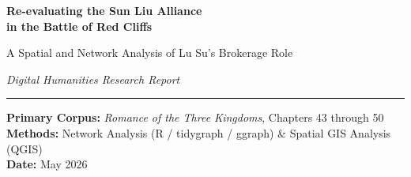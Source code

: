 \documentclass[12pt, a4paper]{article}
\newcommand{\booktitle}[1]{\textit{#1}}
\begin{document}

\begin{titlepage}
  \centering
  \vspace*{2cm}

  {\LARGE\bfseries Re-evaluating the Sun Liu Alliance\\[0.4em]
  in the Battle of Red Cliffs\par}

  \vspace{0.8cm}
  {\large A Spatial and Network Analysis of Lu Su's Brokerage Role\par}

  \vspace{1.5cm}
  {\large\itshape Digital Humanities Research Report\par}

  \vspace{0.8cm}
  \hrule height 0.6pt
  \vspace{0.8cm}

  {\normalsize
  \textbf{Primary Corpus:} \booktitle{Romance of the Three Kingdoms}, Chapters 43 through 50\\[0.3em]
  \textbf{Methods:} Network Analysis (R / tidygraph / ggraph) \&
                    Spatial GIS Analysis (QGIS)\\[0.3em]
  \textbf{Date:} May 2026
  }

  \vfill

  \begin{abstract}
    \noindent
    This paper presents a hybrid computational humanities investigation into the
    Sun Liu alliance that shaped the outcome of the Battle of Red Cliffs, as
    narrated in Chapters~43 through~50 of Luo Guanzhong's
    \booktitle{Romance of the Three Kingdoms}.
    Combining force-directed network analysis with GIS-based spatial analysis,
    we construct two interlocking models: a person to person interaction network
    (37 character nodes) and a person to place spatial interaction network
    (31 location nodes).
    Contrary to narrative prominence, which foregrounds Zhuge Liang and Zhou Yu
    as the alliance's dominant figures, eigenvector centrality analysis reveals
    Lu Su as the true structural broker of the coalition.
    Spatial analysis corroborates this finding: Lu Su's movement trajectories
    constitute the primary logistical thread connecting Wu and Shu territorial
    spheres.
    We argue that the Sun Liu alliance should be reread not as a fusion of
    strategic will, but as a \emph{fragile convergence} held together by one
    diplomat whose labour is rendered invisible by the narrative's emphasis on
    martial spectacle.
    The study demonstrates the capacity of Digital Humanities methods to surface
    latent structural patterns that close reading alone cannot recover.
  \end{abstract}

\end{titlepage}
\end{document}
